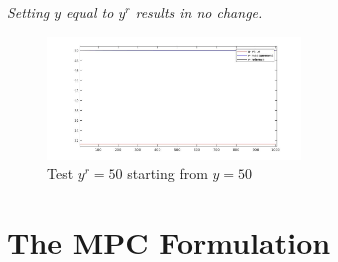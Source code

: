 \documentclass{article}
\begin{document}
\textit{Setting $y$ equal to $y^r$ results in no change.}
\begin{figure}[H]
    \centering
    \includegraphics[width=0.6\textwidth]{wt_model_50_50.jpg}
    \caption{Test $y^r = 50$ starting from $y=50$}
    \label{fig:yisyr}
\end{figure}

\section{The MPC Formulation}
\end{document}
